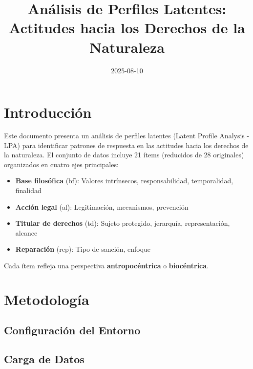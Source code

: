 \documentclass[
  11pt,
  letterpaper,
  DIV=11,
  numbers=noendperiod]{scrartcl}
\title{Análisis de Perfiles Latentes: Actitudes hacia los Derechos de la
Naturaleza}
\author{}
\date{2025-08-10}
\providecommand{\tightlist}{%
  \setlength{\itemsep}{0pt}\setlength{\parskip}{0pt}}
\renewcommand*\contentsname{Table of contents}
\newcommand\contentsname{Table of contents}
\begin{document}
\maketitle

\renewcommand*\contentsname{Table of contents}
{
\hypersetup{linkcolor=}
\setcounter{tocdepth}{3}
\tableofcontents
}

\newpage

\section{Introducción}\label{introducciuxf3n}

Este documento presenta un análisis de perfiles latentes (Latent Profile
Analysis - LPA) para identificar patrones de respuesta en las actitudes
hacia los derechos de la naturaleza. El conjunto de datos incluye 21
ítems (reducidos de 28 originales) organizados en cuatro ejes
principales:

\begin{itemize}
\tightlist
\item
  \textbf{Base filosófica} (bf): Valores intrínsecos, responsabilidad,
  temporalidad, finalidad
\item
  \textbf{Acción legal} (al): Legitimación, mecanismos, prevención\\
\item
  \textbf{Titular de derechos} (td): Sujeto protegido, jerarquía,
  representación, alcance
\item
  \textbf{Reparación} (rep): Tipo de sanción, enfoque
\end{itemize}

Cada ítem refleja una perspectiva \textbf{antropocéntrica} o
\textbf{biocéntrica}.

\section{Metodología}\label{metodologuxeda}

\subsection{Configuración del
Entorno}\label{configuraciuxf3n-del-entorno}

\subsection{Carga de Datos}\label{carga-de-datos}
\end{document}
